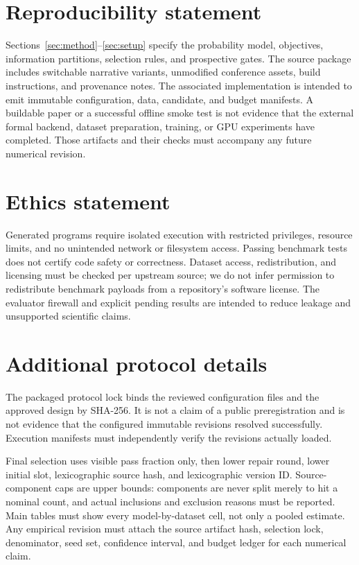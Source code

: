 \documentclass{article}
\begin{document}
\section*{Reproducibility statement}
Sections~\ref{sec:method}--\ref{sec:setup} specify the probability model,
objectives, information partitions, selection rules, and prospective gates.
The source package includes switchable narrative variants, unmodified
conference assets, build instructions, and provenance notes. The associated
implementation is intended to emit immutable configuration, data, candidate,
and budget manifests. A buildable paper or a successful offline smoke test
is not evidence that the external formal backend, dataset preparation,
training, or GPU experiments have completed. Those artifacts and their
checks must accompany any future numerical revision.

\section*{Ethics statement}
Generated programs require isolated execution with restricted privileges,
resource limits, and no unintended network or filesystem access. Passing
benchmark tests does not certify code safety or correctness. Dataset access,
redistribution, and licensing must be checked per upstream source; we do not
infer permission to redistribute benchmark payloads from a repository's
software license. The evaluator firewall and explicit pending results are
intended to reduce leakage and unsupported scientific claims.



\appendix
\section{Additional protocol details}
\label{app:details}
The packaged protocol lock binds the reviewed configuration files and the
approved design by SHA-256. It is not a claim of a public preregistration and is not
evidence that the configured immutable revisions resolved successfully.
Execution manifests must independently verify the revisions actually loaded.

Final selection uses visible pass fraction only, then lower repair round,
lower initial slot, lexicographic source hash, and lexicographic version ID.
Source-component caps are upper bounds: components are never split merely to
hit a nominal count, and actual inclusions and exclusion reasons must be
reported. Main tables must show every model-by-dataset cell, not only a
pooled estimate. Any empirical revision must attach the source artifact hash,
selection lock, denominator, seed set, confidence interval, and budget ledger
for each numerical claim.
\end{document}

